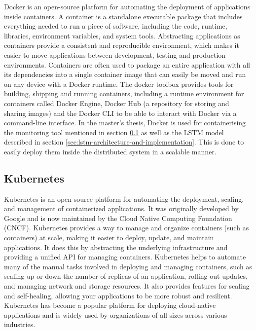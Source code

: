   Docker \cite{dockerDockerDocumentationOverview2023} is an open-source platform for automating the deployment of applications inside containers. A container is a standalone executable package that includes everything needed to run a piece of software, including the code, runtime, libraries, environment variables, and system tools.
  Abstracting applications as containers provide a consistent and reproducible environment, which makes it easier to move applications between development, testing and production environments.
  Containers are often used to package an entire application with all its dependencies into a single container image that can easily be moved and run on any device with a Docker runtime.
  The docker toolbox provides tools for building, shipping and running containers, including a runtime environment for containers called Docker Engine, Docker Hub (a repository for storing and sharing images) and the Docker CLI to be able to interact with Docker via a command-line interface.
  In the master's thesis, Docker is used for containerising the monitoring tool mentioned in section \ref{sec:kubernetes-third-party} as well as the LSTM model described in section \ref{sec:lstm-architecture-and-implementation}.
  This is done to easily deploy them inside the distributed system in a scalable manner. 

\subsection{Kubernetes}
\label{sec:kubernetes-third-party}
  Kubernetes \cite{the-linux-foundationKubernetesDocumentationGetting} is an open-source platform for automating the deployment, scaling, and management of containerized applications. It was originally developed by Google and is now maintained by the Cloud Native Computing Foundation (CNCF).
  Kubernetes provides a way to manage and organize containers (such as  containers) at scale, making it easier to deploy, update, and maintain applications. It does this by abstracting the underlying infrastructure and providing a unified API for managing containers.
  Kubernetes helps to automate many of the manual tasks involved in deploying and managing containers, such as scaling up or down the number of replicas of an application, rolling out updates, and managing network and storage resources. It also provides features for scaling and self-healing, allowing your applications to be more robust and resilient.
  Kubernetes has become a popular platform for deploying cloud-native applications and is widely used by organizations of all sizes across various industries.

